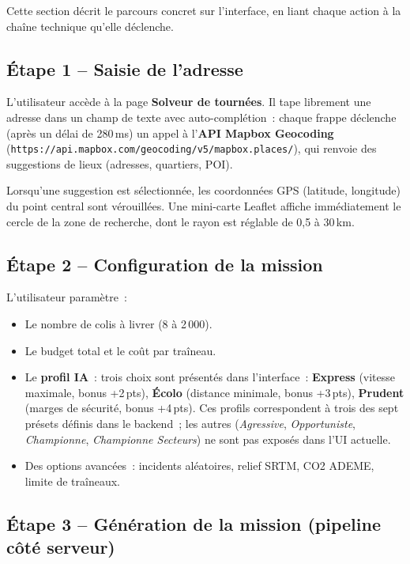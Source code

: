 \documentclass[a4paper, 12pt, twoside]{article}
\begin{document}
Cette section d\'{e}crit le parcours concret sur l'interface, en liant chaque action \`{a} la
cha\^{i}ne technique qu'elle d\'{e}clenche.

\subsection{\'{E}tape 1 -- Saisie de l'adresse}

L'utilisateur acc\`{e}de \`{a} la page \textbf{Solveur de tourn\'{e}es}. Il tape librement une adresse
dans un champ de texte avec auto-compl\'{e}tion~: chaque frappe d\'{e}clenche (apr\`{e}s un
d\'{e}lai de 280\,ms) un appel \`{a} l'\textbf{API Mapbox Geocoding}
(\texttt{https://api.mapbox.com/geocoding/v5/mapbox.places/}), qui renvoie
des suggestions de lieux (adresses, quartiers, POI).

Lorsqu'une suggestion est s\'{e}lectionn\'{e}e, les coordonn\'{e}es GPS (latitude, longitude) du
point central sont v\'{e}rouill\'{e}es. Une mini-carte Leaflet affiche imm\'{e}diatement le cercle
de la zone de recherche, dont le rayon est r\'{e}glable de 0,5 \`{a} 30\,km.

\subsection{\'{E}tape 2 -- Configuration de la mission}

L'utilisateur param\`{e}tre~:
\begin{itemize}
  \item Le nombre de colis \`{a} livrer (8 \`{a} 2\,000).
  \item Le budget total et le co\^{u}t par tra\^{i}neau.
  \item Le \textbf{profil IA}~: trois choix sont pr\'{e}sent\'{e}s dans l'interface~:
    \textbf{Express} (vitesse maximale, bonus +2\,pts), \textbf{\'{E}colo} (distance minimale,
    bonus +3\,pts), \textbf{Prudent} (marges de s\'{e}curit\'{e}, bonus +4\,pts). Ces profils
    correspondent \`{a} trois des sept pr\'{e}sets d\'{e}finis dans le backend~; les autres
    (\textit{Agressive}, \textit{Opportuniste}, \textit{Championne}, \textit{Championne Secteurs})
    ne sont pas expos\'{e}s dans l'UI actuelle.
  \item Des options avanc\'{e}es~: incidents al\'{e}atoires, relief SRTM, CO2 ADEME, limite
        de tra\^{i}neaux.
\end{itemize}

\subsection{\'{E}tape 3 -- G\'{e}n\'{e}ration de la mission (pipeline c\^{o}t\'{e} serveur)}
\end{document}
